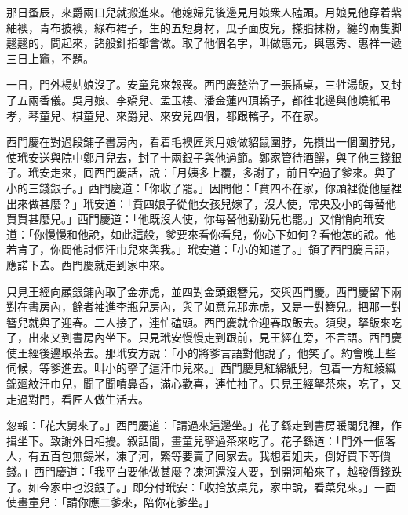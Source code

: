 那日蚤辰，來爵兩口兒就搬進來。他媳婦兒後邊見月娘衆人磕頭。月娘見他穿着紫紬襖，青布披襖，綠布裙子，生的五短身材，瓜子面皮兒，搽脂抹粉，纏的兩隻脚翹翹的，問起來，諸般針指都會做。取了他個名字，叫做惠元，與惠秀、惠祥一遞三日上竈，不題。

一日，門外楊姑娘沒了。安童兒來報䘮。西門慶整治了一張插桌，三牲湯飯，又封了五兩香儀。吳月娘、李嬌兒、孟玉樓、潘金蓮四頂轎子，都徃北邊與他燒紙弔孝，琴童兒、棋童兒、來爵兒、來安兒四個，都跟轎子，不在家。

西門慶在對過段鋪子書房內，看着毛襖匠與月娘做貂鼠圍脖，先攢出一個圍脖兒，使玳安送與院中鄭月兒去，封了十兩銀子與他過節。鄭家管待酒饌，與了他三錢銀子。玳安走來，囘西門慶話，說：「月姨多上覆，多謝了，前日空過了爹來。與了小的三錢銀子。」西門慶道：「你收了罷。」因問他：「賁四不在家，你頭裡從他屋裡出來做甚麼？」玳安道：「賁四娘子從他女孩兒嫁了，沒人使，常央及小的每替他買買甚麼兒。」西門慶道：「他既沒人使，你每替他勤勤兒也罷。」又悄悄向玳安道：「你慢慢和他說，如此這般，爹要來看你看兒，你心下如何？看他怎的說。他若肯了，你問他討個汗巾兒來與我。」玳安道：「小的知道了。」領了西門慶言語，應諾下去。西門慶就走到家中來。

只見王經向顧銀鋪內取了金赤虎，並四對金頭銀簪兒，交與西門慶。西門慶留下兩對在書房內，餘者袖進李瓶兒房內，與了如意兒那赤虎，又是一對簪兒。把那一對簪兒就與了迎春。二人接了，連忙磕頭。西門慶就令迎春取飯去。須臾，拏飯來吃了，出來又到書房內坐下。只見玳安慢慢走到跟前，見王經在旁，不言語。西門慶使王經後邊取茶去。那玳安方說：「小的將爹言語對他說了，他笑了。約會晚上些伺候，等爹進去。叫小的拏了這汗巾兒來。」西門慶見紅綿紙兒，包着一方紅綾織錦廻紋汗巾兒，聞了聞噴鼻香，滿心歡喜，連忙袖了。只見王經拏茶來，吃了，又走過對門，看匠人做生活去。

忽報：「花大舅來了。」西門慶道：「請過來這邊坐。」花子繇走到書房暖閣兒裡，作揖坐下。致謝外日相擾。叙話間，畫童兒拏過茶來吃了。花子繇道：「門外一個客人，有五百包無錫米，凍了河，緊等要賣了囘家去。我想着姐夫，倒好買下等價錢。」西門慶道：「我平白要他做甚麼？凍河還沒人要，到開河船來了，越發價錢跌了。如今家中也沒銀子。」即分付玳安：「收拾放桌兒，家中說，看菜兒來。」一面使畫童兒：「請你應二爹來，陪你花爹坐。」

